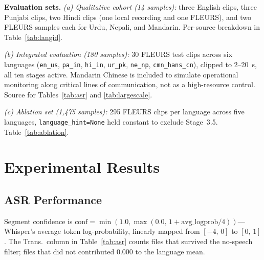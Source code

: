 \documentclass[conference]{IEEEtran}
\begin{document}
\textbf{Evaluation sets.}
\textit{(a) Qualitative cohort (14 samples):} three English clips, three Punjabi clips, two Hindi clips (one local recording and one FLEURS), and two FLEURS samples each for Urdu, Nepali, and Mandarin. Per-source breakdown in Table~\ref{tab:langid}.

\textit{(b) Integrated evaluation (180 samples):} 30 FLEURS test clips across six languages (\texttt{en\_us}, \texttt{pa\_in}, \texttt{hi\_in}, \texttt{ur\_pk}, \texttt{ne\_np}, \texttt{cmn\_hans\_cn}), clipped to 2--20~s, all ten stages active. Mandarin Chinese is included to simulate operational monitoring along critical lines of communication, not as a high-resource control. Source for Tables~\ref{tab:asr} and \ref{tab:largescale}.

\textit{(c) Ablation set (1,475 samples):} 295 FLEURS clips per language across five languages, \texttt{language\_hint=None} held constant to exclude Stage~3.5. Table~\ref{tab:ablation}.

\section{Experimental Results}

\subsection{ASR Performance}
\label{sec:asr}

Segment confidence is $\text{conf} = \min(1.0,\max(0.0,\,1 + \text{avg\_logprob}/4))$---Whisper's average token log-probability, linearly mapped from $[-4,\,0]$ to $[0,\,1]$. The Trans.\ column in Table~\ref{tab:asr} counts files that survived the no-speech filter; files that did not contributed 0.000 to the language mean.
\end{document}
